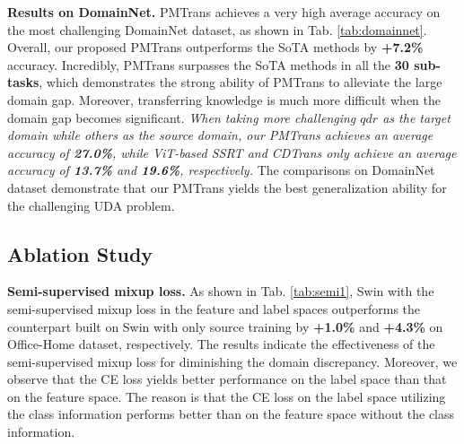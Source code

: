 \documentclass[10pt,twocolumn,letterpaper, ]{article}
\begin{document}
\vspace{-2pt}
\begin{table*}[t!]
\centering
{}
\vspace{-8pt}
\caption{Effect of PatchMix. The best performance is marked as \textbf{bold}.}
\vspace{-13pt}
\label{tab:Patch_Mixup}
\end{table*}
\noindent\textbf{Results on DomainNet.} PMTrans achieves a very high average accuracy on the most challenging DomainNet dataset, as shown in Tab. \ref{tab:domainnet}. Overall, our proposed PMTrans outperforms the SoTA methods by \textbf{+7.2\%} accuracy. Incredibly, PMTrans surpasses the SoTA methods in all the \textbf{30 sub-tasks}, which demonstrates the strong ability of PMTrans to alleviate the large domain gap. Moreover, transferring knowledge is much more difficult when the domain gap becomes significant. 
\textit{When taking more challenging $qdr$ as the target domain while others as the source domain, our PMTrans achieves an average accuracy of \textbf{27.0\%}, while ViT-based SSRT and CDTrans only achieve an average accuracy of \textbf{13.7\%} and \textbf{19.6\%}, respectively.} The comparisons on DomainNet dataset demonstrate that our PMTrans yields the best generalization ability for the challenging UDA problem.
\subsection{Ablation Study}



\noindent\textbf{Semi-supervised mixup loss.}
As shown in Tab. \ref{tab:semi1}, Swin with the semi-supervised mixup loss in the feature and label spaces outperforms the counterpart built on Swin with only source training by \textbf{+1.0\%} and \textbf{+4.3\%} on Office-Home dataset, respectively. The results indicate the effectiveness of the semi-supervised mixup loss for diminishing the domain discrepancy. Moreover, we observe that the CE loss yields better performance on the label space than that on the feature space. The reason is that the CE loss on the label space utilizing the class information performs better than on the feature space without the class information.
\end{document}
